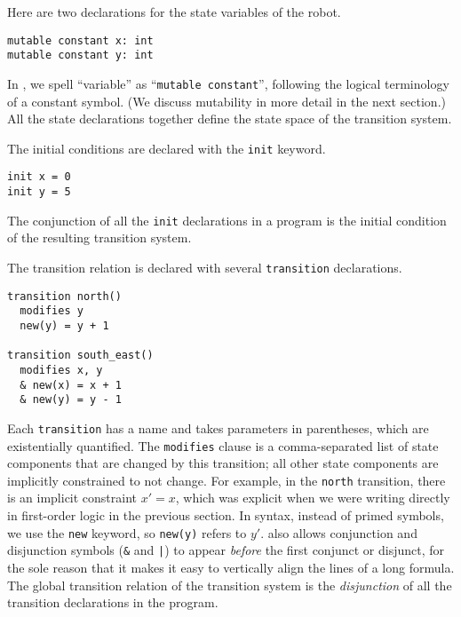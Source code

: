 Here are two declarations for the state variables of the robot.%
\begin{lstlisting}[language=mypyvy, xleftmargin=.2\textwidth, xrightmargin=.2\textwidth]
mutable constant x: int
mutable constant y: int
\end{lstlisting}
In \mypyvy, we spell ``variable'' as ``\lstinline[language=mypyvy]{mutable constant}'',
  following the logical terminology of a constant symbol.
(We discuss mutability in more detail in the next section.)
All the state declarations together
  define the state space of the transition system.

The initial conditions are declared with the \lstinline[language=mypyvy]{init} keyword.
\begin{lstlisting}[language=mypyvy, xleftmargin=.2\textwidth, xrightmargin=.2\textwidth]
init x = 0
init y = 5
\end{lstlisting}
The conjunction of all the \lstinline[language=mypyvy]{init} declarations in a \mypyvy program
  is the initial condition of the resulting transition system.

The transition relation is declared
  with several \lstinline[language=mypyvy]{transition} declarations.
\begin{lstlisting}[language=mypyvy, xleftmargin=.2\textwidth, xrightmargin=.2\textwidth]
transition north()
  modifies y
  new(y) = y + 1

transition south_east()
  modifies x, y
  & new(x) = x + 1
  & new(y) = y - 1
\end{lstlisting}
Each \lstinline[language=mypyvy]{transition} has a name and takes parameters in parentheses,
  which are existentially quantified.
The \lstinline[language=mypyvy]{modifies} clause is a comma-separated list of state components
  that are changed by this transition;
  all other state components are implicitly constrained to not change.
For example, in the \lstinline[language=mypyvy]{north} transition,
  there is an implicit constraint $x' = x$,
  which was explicit when we were writing directly in first-order logic
  in the previous section.
In \mypyvy syntax, instead of primed symbols,
  we use the \lstinline[language=mypyvy]{new} keyword,
  so \lstinline[language=mypyvy]{new(y)} refers to $y'$.
\mypyvy also allows conjunction and disjunction symbols
  (\texttt{\&} and \texttt{|}) to appear \emph{before} the first conjunct or disjunct,
  for the sole reason that it makes it easy to vertically align
  the lines of a long formula.
The global transition relation of the transition system is
  the \emph{disjunction} of all the transition declarations in the program.

